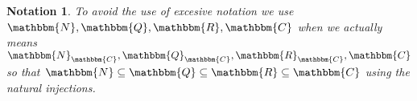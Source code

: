 \documentclass{book}
\newtheorem{notation}{Notation}
{\theorembodyfont{\rmfamily}\newtheorem{note}{Note}}
\begin{document}
{{\

\

\begin{notation}
  To avoid the use of excesive notation we use $\mathbbm{N}, \mathbbm{Q},
  \mathbbm{R}, \mathbbm{C}$ when we actually means $\mathbbm{N}_{\mathbbm{C}},
  \mathbbm{Q}_{\mathbbm{C}}, \mathbbm{R}_{\mathbbm{C}}, \mathbbm{C}$ so that
  $\mathbbm{N} \subseteq \mathbbm{Q} \subseteq \mathbbm{R} \subseteq
  \mathbbm{C}$ using the natural injections.
\end{notation}{\hspace*{\fill}}}}
\end{document}
